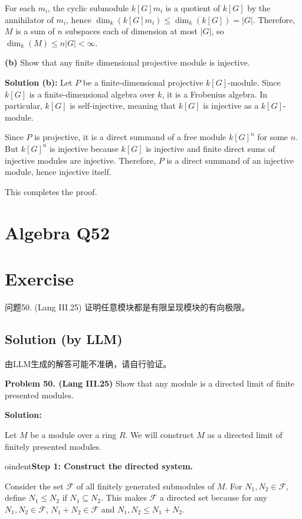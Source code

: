 \documentclass[12pt]{book}
\begin{document}
For each $m_i$, the cyclic submodule $k[G]m_i$ is a quotient of $k[G]$ by the annihilator of $m_i$, hence $\dim_k(k[G]m_i) \leq \dim_k(k[G]) = |G|$. Therefore, $M$ is a sum of $n$ subspaces each of dimension at most $|G|$, so $\dim_k(M) \leq n|G| < \infty$.

\textbf{(b)} Show that any finite dimensional projective module is injective.

\textbf{Solution (b):} Let $P$ be a finite-dimensional projective $k[G]$-module. Since $k[G]$ is a finite-dimensional algebra over $k$, it is a Frobenius algebra. In particular, $k[G]$ is self-injective, meaning that $k[G]$ is injective as a $k[G]$-module. 

Since $P$ is projective, it is a direct summand of a free module $k[G]^n$ for some $n$. But $k[G]^n$ is injective because $k[G]$ is injective and finite direct sums of injective modules are injective. Therefore, $P$ is a direct summand of an injective module, hence injective itself. 

This completes the proof.
\newpage
\section{Algebra Q52}
\section*{Exercise}
问题50. (Lang III.25) 证明任意模块都是有限呈现模块的有向极限。





\subsection*{Solution (by LLM)}
由LLM生成的解答可能不准确，请自行验证。

\textbf{Problem 50. (Lang III.25)} Show that any module is a directed limit of finite presented modules.

\textbf{Solution:}

Let $M$ be a module over a ring $R$. We will construct $M$ as a directed limit of finitely presented modules.

 oindent\textbf{Step 1: Construct the directed system.}

Consider the set $\mathcal{F}$ of all finitely generated submodules of $M$. For $N_1, N_2 \in \mathcal{F}$, define $N_1 \leq N_2$ if $N_1 \subseteq N_2$. This makes $\mathcal{F}$ a directed set because for any $N_1, N_2 \in \mathcal{F}$, $N_1 + N_2 \in \mathcal{F}$ and $N_1, N_2 \leq N_1 + N_2$.
\end{document}
